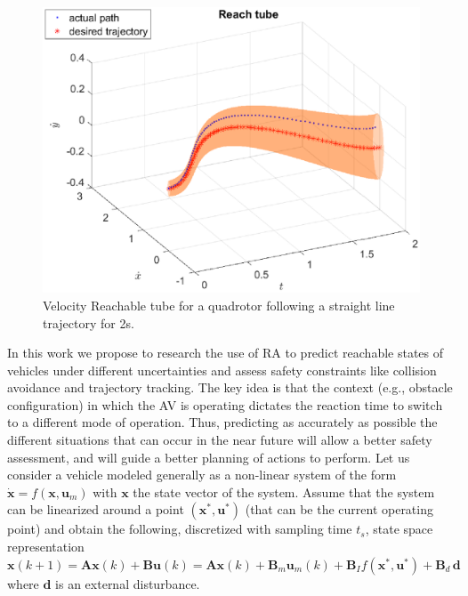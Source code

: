 \begin{figure}
\vspace{-5pt}
\centering
\includegraphics[width = \linewidth ]{fig/reach_set_vel.eps} 
\caption{Velocity Reachable tube for a quadrotor following a straight line trajectory for 2s.}
\vspace{-5pt}
\label{fig:reach_set}\end{figure}
In this work we propose to research the use of RA to predict reachable states of vehicles under different uncertainties and assess safety constraints like collision avoidance and trajectory tracking. The key idea is that the context (e.g., obstacle configuration) in which the AV is operating dictates the reaction time to switch to a different mode of operation. Thus, predicting as accurately as possible the different situations that can occur in the near future will allow a better safety assessment,  and will guide a better planning of actions to perform.
 Let us consider a vehicle modeled generally as a non-linear system of the form $\dot{\bm{x}} = f(\bm{x}, \bm{u}_m)$ with $\bm{x}$ the state vector of the system.
Assume that the system can be linearized around a point $\left(\bm{x}^{*}, \bm{u}^{*}\right)$ (that can be the current operating point) and obtain the following, discretized with sampling time $t_s$, state space representation $\bm{x}(k+1) =  \bm{A} \bm{x}(k) + \bm{B} \bm{u}(k) =  \bm{A} \bm{x}(k) + \bm{B}_m \bm{u}_m(k) + \bm{B}_I f\left(\bm{x}^{*}, \bm{u}^{*}\right) + \bm{B}_d \, \bm{d}$
where $\bm{d}$ is an external disturbance.  %


